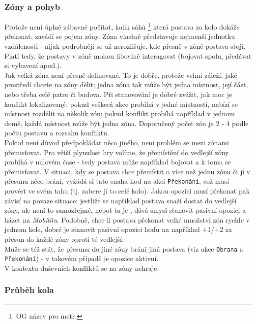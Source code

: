 \subsubsection{Zóny a pohyb}
\label{sec:zónyapohyb}

Protože není úplně zábavné počítat, kolik sáhů \footnote{OG název pro metr.} která postava za kolo dokáže překonat, zavádí se pojem zóny. Zóna vlastně představuje nejmenší jednotku vzdálenosti - nijak podrobněji se už nerozlišuje, kde přesně v zóně postava stojí. Platí tedy, že postavy v zóně mohou libovlně interagovat (bojovat spolu, předávat si vybavení apod.).\\
Jak velká zóna není přesně definované. To je dobře, protože velmi záleží, jaké prostředí chcete na zóny dělit; jedna zóna tak může být jedna místnost, její část, nebo třeba celé patro či budova. Při stanovování je dobré zvážit, jak moc je konflikt lokalizovaný: pokud veškerá akce probíhá v jedné místnosti, nabízí se místnost rozdělit na několik zón; pokud konflikt probíhá například v jednom domě, každá místnost může být jedna zóna. Doporučený počet zón je 2 - 4 podle počtu postavu a rozsahu konfliktu.\\
Pokud není důvod předpokládat něco jiného, není problém se mezi zónami přemisťovat. Pro větší plynulost hry volíme, že přemístění do vedlejší zóny probíhá v nulovém čase - tedy postava může například bojovat a k tomu se přemisťovat. V situaci, kdy se postava chce přemístit o více než jednu zónu či jí v přesunu něco brání, vyžádá si tato snaha hod na akci \texttt{Překonání}, což musí provést ve svém tahu (tj. zabere jí to celé kolo). Jakou opozici musí překonat pak závisí na povaze situace: jestliže se například postava snaží dostat do vedlejší zóny, ale není to samozřejmé, neboť ta je , dává smysl stanovit pasivní opozici a házet na \textit{Mobilitu}. Podobně, chce-li postava překonat velké množství zón rychle v jednom kole, dobré je stanovit pasivní opozici hodu na například +1/+2 za přesun do každé zóny oproti té vedlejší.\\
Může se též stát, že přesunu do jiné zóny brání jiná postava (viz akce \texttt{Obrana} a \texttt{Překonání}) - v takovém případě je opozice aktivní.\\
V kontextu duševních konfliktů se na zóny nehraje.


\subsubsection{Průběh kola}
\label{sec:prubehkola}

